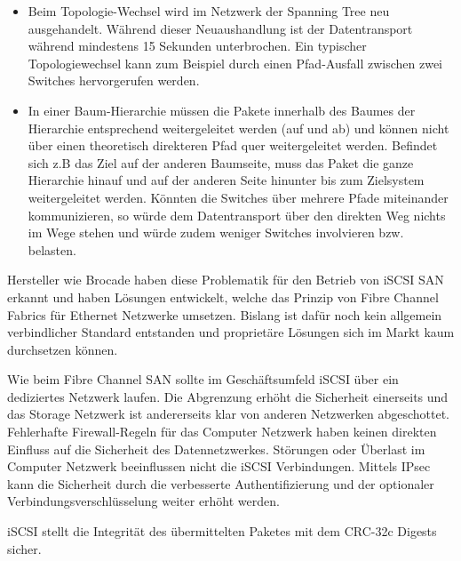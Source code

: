 \begin{itemize}
\item Beim Topologie-Wechsel wird im Netzwerk der Spanning Tree neu ausgehandelt. Während dieser Neuaushandlung ist der Datentransport während mindestens 15 Sekunden unterbrochen. Ein typischer Topologiewechsel kann zum Beispiel durch einen Pfad-Ausfall zwischen zwei Switches hervorgerufen werden.

\item In einer Baum-Hierarchie müssen die Pakete innerhalb des Baumes der Hierarchie entsprechend weitergeleitet werden (auf und ab) und können nicht über einen theoretisch direkteren Pfad quer weitergeleitet werden. Befindet sich z.B das Ziel auf der anderen Baumseite, muss das Paket die ganze Hierarchie hinauf und auf der anderen Seite hinunter bis zum Zielsystem weitergeleitet werden. Könnten die Switches über mehrere Pfade miteinander kommunizieren, so würde dem Datentransport über den direkten Weg nichts im Wege stehen und würde zudem weniger Switches involvieren bzw. belasten.
\end{itemize}

Hersteller wie Brocade haben diese Problematik für den Betrieb von iSCSI SAN erkannt und haben Lösungen entwickelt, welche das Prinzip von Fibre Channel Fabrics für Ethernet Netzwerke umsetzen. Bislang ist dafür noch kein allgemein verbindlicher Standard entstanden und proprietäre Lösungen sich im Markt kaum durchsetzen können.

Wie beim Fibre Channel SAN sollte im Geschäftsumfeld iSCSI über ein dediziertes Netzwerk laufen. Die Abgrenzung erhöht die Sicherheit einerseits und das Storage Netzwerk ist andererseits klar von anderen Netzwerken abgeschottet. Fehlerhafte Firewall-Regeln für das Computer Netzwerk haben keinen direkten Einfluss auf die Sicherheit des Datennetzwerkes. Störungen oder Überlast im Computer Netzwerk beeinflussen nicht die iSCSI Verbindungen. Mittels IPsec kann die Sicherheit durch die verbesserte Authentifizierung und der optionaler Verbindungsverschlüsselung weiter erhöht werden. 

iSCSI stellt die Integrität des übermittelten Paketes mit dem CRC-32c Digests sicher. 

